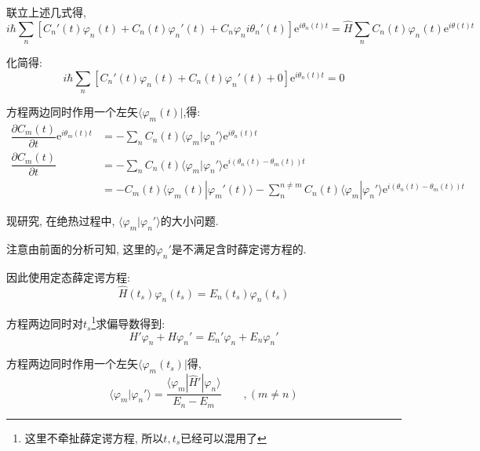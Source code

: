 \documentclass[a4paper, 11pt]{article}
\begin{document}
\begin{spacing}{1.2}
        联立上述几式得, 
        \begin{equation}
          i\hbar\sum_n\left[C_n'(t)\varphi_n(t)+C_n(t)\varphi_n'(t)+C_n\varphi_ni\theta_n'(t)\right]
          \mathrm{e}^{i\theta_n(t)t} = \hat{H}\sum_nC_n(t)\varphi_n(t)\mathrm{e}^{i\theta(t)t}
        \end{equation}

        化简得:
        \begin{equation}
          i\hbar\sum_n\left[C_n'(t)\varphi_n(t)+C_n(t)\varphi_n'(t)+0\right]
          \mathrm{e}^{i\theta_n(t)t} =0
        \end{equation}

        方程两边同时作用一个左矢$\langle\varphi_m(t)|$,得:    
        \begin{equation}
          \label{complex_Cm}
          \begin{aligned}
            \dfrac{\partial{}C_m(t)}{\partial{}t}\mathrm{e}^{i\theta_m(t)t} &= -\sum_nC_n(t)
            \langle\varphi_m|\varphi_n'\rangle\mathrm{e}^{i\theta_n(t)t}\\
            \dfrac{\partial{}C_m(t)}{\partial{}t} &= -\sum_nC_n(t)\langle\varphi_m|\varphi_n'\rangle
            \mathrm{e}^{i(\theta_n(t)-\theta_m(t))t}\\
            &= -C_m(t)\langle\varphi_m(t)|\varphi_m'(t)\rangle - \sum_n^{n\ne{}m}C_n(t)
            \langle\varphi_m|\varphi_n'\rangle\mathrm{e}^{i(\theta_n(t)-\theta_m(t))t}
          \end{aligned}
        \end{equation}
      
        现研究, 在绝热过程中, $\langle\varphi_m|\varphi_n'\rangle$的大小问题.
        \par
        注意由前面的分析可知, 这里的$\varphi_n'$是不满足含时薛定谔方程的.
        \par
        因此使用定态薛定谔方程:
        \begin{equation}
          \hat{H}(t_s)\varphi_n(t_s) = E_n(t_s)\varphi_n(t_s)  
        \end{equation}

        方程两边同时对$t_s$\footnote{这里不牵扯薛定谔方程, 所以$t, t_s$已经可以混用了}求偏导数得到:
        \begin{equation}
          H'\varphi_n + H\varphi_n' = E_n'\varphi_n + E_n\varphi_n'
        \end{equation}

        方程两边同时作用一个左矢$\langle\varphi_m(t_s)|$得, 
        \begin{equation}
          \langle\varphi_m|\varphi_n'\rangle = \dfrac{\langle\varphi_m|\hat{H}'|\varphi_n\rangle}
                                              {E_n-E_m}\qquad, (m\ne{}n)
        \end{equation}


\end{spacing}
\end{document}
